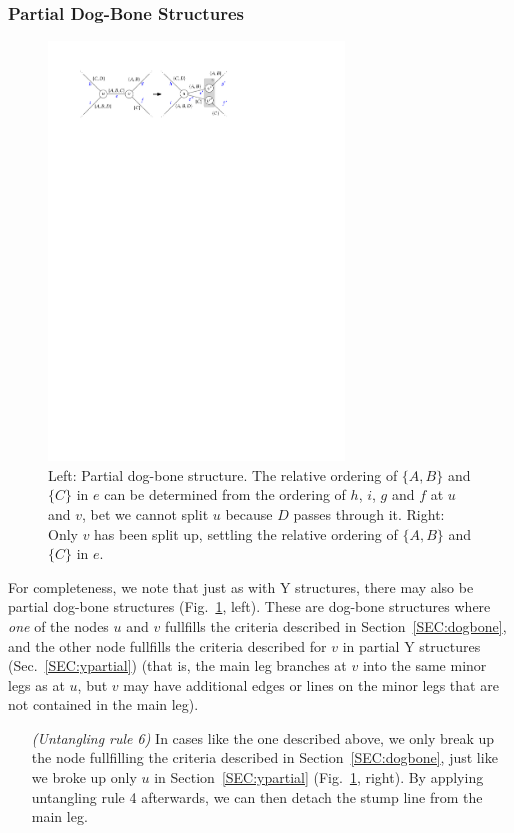 \documentclass[format=acmsmall, review=false, screen=true]{acmart}
\begin{document}
\subsubsection{Partial Dog-Bone Structures}

\begin{figure}
  \includegraphics[width=0.7\textwidth, page=1]{untangling/dogbone_partial.pdf}
  \caption{Left: Partial dog-bone structure. The relative ordering of $\{A, B\}$ and $\{C\}$ in $e$ can be determined from the ordering of $h$, $i$, $g$ and $f$ at $u$ and $v$, bet we cannot split $u$ because $D$ passes through it. Right: Only $v$ has been split up, settling the relative ordering of $\{A, B\}$ and $\{C\}$ in $e$.}  
  \label{FIG:untangle_dogbone_partial}
\end{figure}

For completeness, we note that just as with Y structures, there may also be partial dog-bone structures (Fig.~\ref{FIG:untangle_dogbone_partial}, left).
These are dog-bone structures where \emph{one} of the nodes $u$ and $v$ fullfills the criteria described in Section~\ref{SEC:dogbone}, and the other node fullfills the criteria described for $v$ in partial Y structures (Sec.~\ref{SEC:ypartial}) (that is, the main leg branches at $v$ into the same minor legs as at $u$, but $v$ may have additional edges or lines on the minor legs that are not contained in the main leg). 
\begin{enumerate}[parsep=0.5mm, wide, labelwidth=0mm, itemindent=2.3mm]
  \setlength\itemsep{1pt}
  \item[\emph{(Untangling rule 6)}] In cases like the one described above, we only break up the node fullfilling the criteria described in Section~\ref{SEC:dogbone}, just like we broke up only $u$ in Section~\ref{SEC:ypartial} (Fig.~\ref{FIG:untangle_dogbone_partial}, right). By applying untangling rule 4 afterwards, we can then detach the stump line from the main leg.
\end{enumerate}
\end{document}
